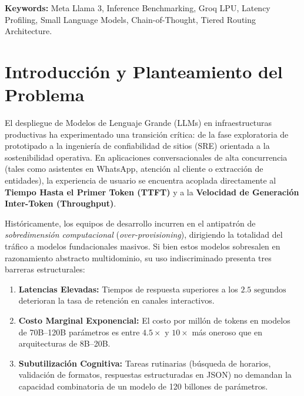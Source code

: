 \documentclass[12pt,letterpaper]{article}
\begin{document}
\vspace{0.5cm}
\noindent\textbf{Keywords:} Meta Llama 3, Inference Benchmarking, Groq LPU, Latency Profiling, Small Language Models, Chain-of-Thought, Tiered Routing Architecture.

\newpage
\tableofcontents
\newpage
{}

\section{Introducción y Planteamiento del Problema}

El despliegue de Modelos de Lenguaje Grande (LLMs) en infraestructuras productivas ha experimentado una transición crítica: de la fase exploratoria de prototipado a la ingeniería de confiabilidad de sitios (SRE) orientada a la sostenibilidad operativa. En aplicaciones conversacionales de alta concurrencia (tales como asistentes en WhatsApp, atención al cliente o extracción de entidades), la experiencia de usuario se encuentra acoplada directamente al \textbf{Tiempo Hasta el Primer Token (TTFT)} y a la \textbf{Velocidad de Generación Inter-Token (Throughput)}.

Históricamente, los equipos de desarrollo incurren en el antipatrón de \textit{sobredimensión computacional} (\textit{over-provisioning}), dirigiendo la totalidad del tráfico a modelos fundacionales masivos. Si bien estos modelos sobresalen en razonamiento abstracto multidominio, su uso indiscriminado presenta tres barreras estructurales:
\begin{enumerate}
    \item \textbf{Latencias Elevadas:} Tiempos de respuesta superiores a los $2.5\text{ segundos}$ deterioran la tasa de retención en canales interactivos.
    \item \textbf{Costo Marginal Exponencial:} El costo por millón de tokens en modelos de 70B--120B parámetros es entre $4.5\times$ y $10\times$ más oneroso que en arquitecturas de 8B--20B.
    \item \textbf{Subutilización Cognitiva:} Tareas rutinarias (búsqueda de horarios, validación de formatos, respuestas estructuradas en JSON) no demandan la capacidad combinatoria de un modelo de 120 billones de parámetros.
\end{enumerate}
\end{document}
